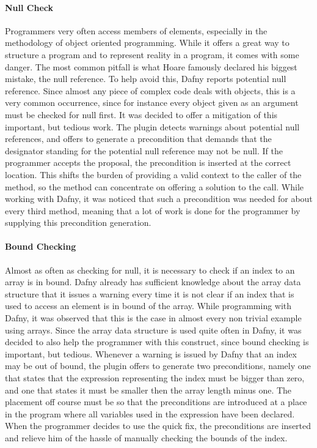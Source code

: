 \paragraph{Null Check}
Programmers very often access members of elements, especially in the methodology of object oriented programming. While it offers a great way to structure a program and to represent reality in a program, it comes with some danger. The most common pitfall is what Hoare famously declared his biggest mistake\cite{hoare}, the null reference. To help avoid this, Dafny reports potential null reference. Since almost any piece of complex code deals with objects, this is a very common occurrence, since for instance every object given as an argument must be checked for null first. \newline
It was decided to offer a mitigation of this important, but tedious work. The plugin detects warnings about potential null references, and offers to generate a precondition that demands that the designator standing for the potential null reference may not be null. If the programmer accepts the proposal, the precondition is inserted at the correct location. This shifts the burden of providing a valid context to the caller of the method, so the method can concentrate on offering a solution to the call. While working with Dafny, it was noticed that such a precondition was needed for about every third method, meaning that a lot of work is done for the programmer by supplying this precondition generation.
\paragraph{Bound Checking}
Almost as often as checking for null, it is necessary to check if an index to an array is in bound. Dafny already has sufficient knowledge about the array data structure that it issues a warning every time it is not clear if an index that is used to access an element is in bound of the array. While programming with Dafny, it was observed that this is the case in almost every non trivial example using arrays. Since the array data structure is used quite often in Dafny, it was decided to also help the programmer with this construct, since bound checking is important, but tedious. \newline
Whenever a warning is issued by Dafny that an index may be out of bound, the plugin offers to generate two preconditions, namely one that states that the expression representing the index must be bigger than zero, and one that states it must be smaller then the array length minus one. The placement off course must be so that the preconditions are introduced at a place in the program where all variables used in the expression have been declared. When the programmer decides to use the quick fix, the preconditions are inserted and relieve him of the hassle of manually checking the bounds of the index.
